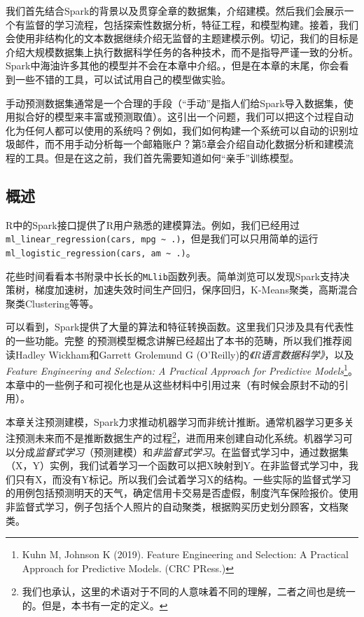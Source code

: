 \documentclass[
]{article}
\begin{document}
我们首先结合Spark的背景以及贯穿全章的数据集，介绍建模。然后我们会展示一个有监督的学习流程，包括探索性数据分析，特征工程，和模型构建。接着，我们会使用非结构化的文本数据继续介绍无监督的主题建模示例。切记，我们的目标是介绍大规模数据集上执行数据科学任务的各种技术，而不是指导严谨一致的分析。Spark中海油许多其他的模型并不会在本章中介绍。，但是在本章的末尾，你会看到一些不错的工具，可以试试用自己的模型做实验。

手动预测数据集通常是一个合理的手段（``手动''是指人们给Spark导入数据集，使用拟合好的模型来丰富或预测取值）。这引出一个问题，我们可以把这个过程自动化为任何人都可以使用的系统吗？例如，我们如何构建一个系统可以自动的识别垃圾邮件，而不用手动分析每一个邮箱账户？第5章会介绍自动化数据分析和建模流程的工具。但是在这之前，我们首先需要知道如何``亲手''训练模型。

\hypertarget{ux6982ux8ff0-3}{%
\subsection{概述}\label{ux6982ux8ff0-3}}

R中的Spark接口提供了R用户熟悉的建模算法。例如，我们已经用过\texttt{ml\_linear\_regression(cars,\ mpg\ \textasciitilde{}\ .)}，但是我们可以只用简单的运行\texttt{ml\_logistic\_regression(cars,\ am\ \textasciitilde{}\ .)}。

花些时间看看本书附录中长长的\texttt{MLlib}函数列表。简单浏览可以发现Spark支持决策树，梯度加速树，加速失效时间生产回归，保序回归，K-Means聚类，高斯混合聚类Clustering等等。

可以看到，Spark提供了大量的算法和特征转换函数。这里我们只涉及具有代表性的一些功能。完整
的预测模型概念讲解已经超出了本书的范畴，所以我们推荐阅读Hadley
Wickham和Garrett Grolemund G
(O'Reilly)的\emph{《R语言数据科学》}，以及\emph{Feature Engineering and
Selection: A Practical Approach for Predictive Models}\footnote{Kuhn M,
  Johnson K (2019). Feature Engineering and Selection: A Practical
  Approach for Predictive Models. (CRC PRess.)}。本章中的一些例子和可视化也是从这些材料中引用过来（有时候会原封不动的引用）。

本章关注预测建模，Spark力求推动机器学习而非统计推断。通常机器学习更多关注预测未来而不是推断数据生产的过程\footnote{我们也承认，这里的术语对于不同的人意味着不同的理解，二者之间也是统一的。但是，本书有一定的定义。}，进而用来创建自动化系统。机器学习可以分成\emph{监督式学习}（预测建模）和\emph{非监督式学习}。在监督式学习中，通过数据集（X，Y）实例，我们试着学习一个函数可以把X映射到Y。在非监督式学习中，我们只有X，而没有Y标记。所以我们会试着学习X的结构。一些实际的监督式学习的用例包括预测明天的天气，确定信用卡交易是否虚假，制度汽车保险报价。使用非监督式学习，例子包括个人照片的自动聚类，根据购买历史划分顾客，文档聚类。
\end{document}
